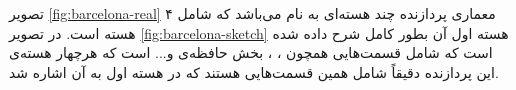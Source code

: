 \documentclass[11pt, twoside]{imsproc}
\begin{document}
\begin{itemize}
تصویر 
\ref{fig:barcelona-real}
معماری پردازنده چند هسته‌ای به نام  می‌باشد که شامل ۴ هسته است. در تصویر
\ref{fig:barcelona-sketch}
هسته اول آن بطور کامل شرح داده شده است که شامل قسمت‌هایی همچون
،
،
بخش حافظه‌ی  و... است که هرچهار هسته‌ی این پردازنده دقیقاً شامل همین قسمت‌هایی هستند که در هسته اول به آن اشاره شد.
\begin{figure}[H]
\begin{center}
\hspace{3mm}
\end{center}
\label{fig:amd-barcelona}
\end{figure}

\end{itemize}
\end{document}
